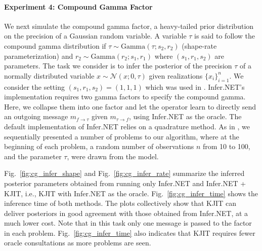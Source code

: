 \documentclass[english]{article}
\theoremstyle{plain}
\theoremstyle{plain}
\newcommand{\factor}{f}				%
\newcommand{\msg}[2]{m_{#1 \rightarrow #2}}			%
\newcommand{\figref}[1]{Fig.~\ref{#1}}
\begin{document}
\paragraph{Experiment 4: Compound Gamma Factor} We next simulate the compound gamma factor, 
 a heavy-tailed prior distribution on the precision of a Gaussian random variable.
A variable $\tau$ is said to follow the compound gamma distribution 
if $\tau \sim \text{Gamma}(\tau; s_2, r_2)$ (shape-rate parameterization) and 
$r_2 \sim \text{Gamma}(r_2; s_1, r_1)$ where $(s_1, r_1, s_2)$ are parameters. 
The task we consider is to infer the posterior of the precision $\tau$ of a normally 
distributed variable $x \sim \mathcal{N}(x; 0, \tau)$ given realizations 
$\{x_i\}_{i=1}^n$. We consider the setting $(s_1, r_1, s_2) = (1, 1, 1)$ which was 
used in \cite{Heess2013}. Infer.NET's implementation requires two gamma factors
to specify the compound gamma. Here, we collapse them into one factor 
and let the operator learn to directly send an outgoing message $\msg{\factor}{\tau}$ 
given $\msg{\tau}{\factor}$, using Infer.NET as the oracle. 
The  default implementation of Infer.NET relies on a quadrature method.
As in \cite{Eslami2014}, we sequentially presented a number of 
problems to our algorithm, where at the beginning of each problem, a random number of observations $n$
from 10 to 100, and the parameter $\tau$, were drawn from the model.

\figref{fig:cg_infer_shape} and \figref{fig:cg_infer_rate} summarize the inferred 
posterior parameters obtained from running only Infer.NET and Infer.NET + KJIT, i.e., 
KJIT with Infer.NET as the oracle. \figref{fig:cg_infer_time} shows the inference 
time of both methods. The plots collectively show that KJIT can deliver posteriors 
in good agreement with those obtained from Infer.NET, at a much lower cost. 
Note that in this task only one message is passed to the factor in each problem.
\figref{fig:cg_infer_time} also indicates that KJIT requires fewer oracle 
consultations as more problems are seen.

\end{document}
